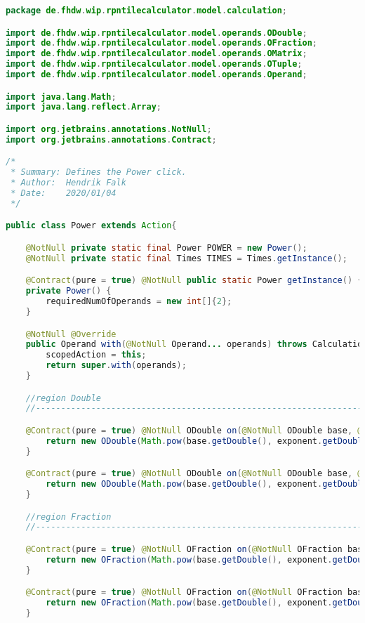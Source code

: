 \begin{lstlisting}[caption=Power (Falk),label=list:Power,language=Java]
package de.fhdw.wip.rpntilecalculator.model.calculation;

import de.fhdw.wip.rpntilecalculator.model.operands.ODouble;
import de.fhdw.wip.rpntilecalculator.model.operands.OFraction;
import de.fhdw.wip.rpntilecalculator.model.operands.OMatrix;
import de.fhdw.wip.rpntilecalculator.model.operands.OTuple;
import de.fhdw.wip.rpntilecalculator.model.operands.Operand;

import java.lang.Math;
import java.lang.reflect.Array;

import org.jetbrains.annotations.NotNull;
import org.jetbrains.annotations.Contract;

/*
 * Summary: Defines the Power click.
 * Author:  Hendrik Falk
 * Date:    2020/01/04
 */

public class Power extends Action{

    @NotNull private static final Power POWER = new Power();
    @NotNull private static final Times TIMES = Times.getInstance();

    @Contract(pure = true) @NotNull public static Power getInstance() { return POWER; }
    private Power() {
        requiredNumOfOperands = new int[]{2};
    }

    @NotNull @Override
    public Operand with(@NotNull Operand... operands) throws CalculationException {
        scopedAction = this;
        return super.with(operands);
    }

    //region Double
    //------------------------------------------------------------------------------------

    @Contract(pure = true) @NotNull ODouble on(@NotNull ODouble base, @NotNull ODouble exponent) {
        return new ODouble(Math.pow(base.getDouble(), exponent.getDouble()));
    }

    @Contract(pure = true) @NotNull ODouble on(@NotNull ODouble base, @NotNull OFraction exponent) {
        return new ODouble(Math.pow(base.getDouble(), exponent.getDouble()));
    }

    //region Fraction
    //------------------------------------------------------------------------------------

    @Contract(pure = true) @NotNull OFraction on(@NotNull OFraction base, @NotNull ODouble exponent){
        return new OFraction(Math.pow(base.getDouble(), exponent.getDouble()));
    }

    @Contract(pure = true) @NotNull OFraction on(@NotNull OFraction base, @NotNull OFraction exponent){
        return new OFraction(Math.pow(base.getDouble(), exponent.getDouble()));
    }


\end{lstlisting}
